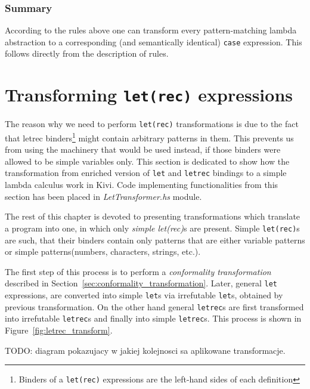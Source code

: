 \documentclass[a4paper]{report}
\begin{document}
\subsubsection{Summary}
According to the rules above one can transform every pattern-matching lambda
abstraction to a corresponding (and semantically identical) \texttt{case}
expression. This follows directly from the description of rules.

\section{Transforming \texttt{let(rec)} expressions}
\label{sec:letrec_transform}
The reason why we need to perform \texttt{let(rec)} transformations is due to
the fact that letrec binders\footnote{Binders of a \texttt{let(rec)}
expressions are the left-hand sides of each definition} might contain arbitrary
patterns in them. This prevents us from using the machinery that would be used
instead, if those binders were allowed to be simple variables only. This
section is dedicated to show how the transformation from enriched version of
\texttt{let} and \texttt{letrec} bindings to a simple lambda calculus work in
Kivi. Code implementing functionalities from this section has been placed in
\textit{LetTransformer.hs} module.

The rest of this chapter is devoted to presenting transformations which
translate a program into one, in which only \textit{simple let(rec)}s are
present. Simple \texttt{let(rec)}s are such, that their binders contain only
patterns that are either variable patterns or simple patterns(numbers,
characters, strings, etc.).

The first step of this process is to perform a \textit{conformality
transformation} described in Section~\ref{sec:conformality_transformation}.
Later, general \texttt{let} expressions, are converted into simple
\texttt{let}s via irrefutable \texttt{let}s, obtained by previous
transformation. On the other hand general \texttt{letrec}s are first
transformed into irrefutable \texttt{letrec}s and finally into simple
\texttt{letrec}s. This process is shown in Figure~\ref{fig:letrec_transform}.

TODO: diagram pokazujacy w jakiej kolejnosci sa aplikowane transformacje.
\end{document}
